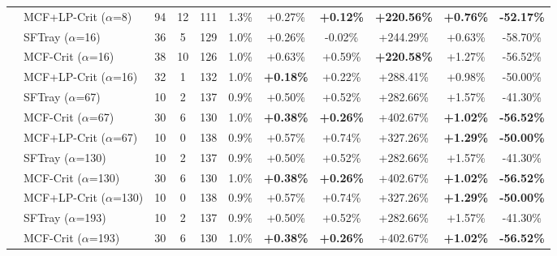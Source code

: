 \begin{table}[t]
{\begin{tabular}{ll|cccc|ccc|cc}
 & MCF+LP-Crit ($\alpha$=8) & 94 & 12 & 111 & 1.3\% & +0.27\% & \textbf{+0.12\%} & \textbf{+220.56\%} & \textbf{+0.76\%} & \textbf{-52.17\%} \\

\addlinespace[0.5em]

 & SFTray ($\alpha$=16) & 36 & 5 & 129 & 1.0\% & +0.26\% & -0.02\% & +244.29\% & +0.63\% & -58.70\% \\

 & MCF-Crit ($\alpha$=16) & 38 & 10 & 126 & 1.0\% & +0.63\% & +0.59\% & \textbf{+220.58\%} & +1.27\% & -56.52\% \\

 & MCF+LP-Crit ($\alpha$=16) & 32 & 1 & 132 & 1.0\% & \textbf{+0.18\%} & +0.22\% & +288.41\% & +0.98\% & -50.00\% \\

\addlinespace[0.5em]

 & SFTray ($\alpha$=67) & 10 & 2 & 137 & 0.9\% & +0.50\% & +0.52\% & +282.66\% & +1.57\% & -41.30\% \\

 & MCF-Crit ($\alpha$=67) & 30 & 6 & 130 & 1.0\% & \textbf{+0.38\%} & \textbf{+0.26\%} & +402.67\% & \textbf{+1.02\%} & \textbf{-56.52\%} \\

 & MCF+LP-Crit ($\alpha$=67) & 10 & 0 & 138 & 0.9\% & +0.57\% & +0.74\% & +327.26\% & \textbf{+1.29\%} & \textbf{-50.00\%} \\

\addlinespace[0.5em]

 & SFTray ($\alpha$=130) & 10 & 2 & 137 & 0.9\% & +0.50\% & +0.52\% & +282.66\% & +1.57\% & -41.30\% \\

 & MCF-Crit ($\alpha$=130) & 30 & 6 & 130 & 1.0\% & \textbf{+0.38\%} & \textbf{+0.26\%} & +402.67\% & \textbf{+1.02\%} & \textbf{-56.52\%} \\

 & MCF+LP-Crit ($\alpha$=130) & 10 & 0 & 138 & 0.9\% & +0.57\% & +0.74\% & +327.26\% & \textbf{+1.29\%} & \textbf{-50.00\%} \\

\addlinespace[0.5em]

 & SFTray ($\alpha$=193) & 10 & 2 & 137 & 0.9\% & +0.50\% & +0.52\% & +282.66\% & +1.57\% & -41.30\% \\

 & MCF-Crit ($\alpha$=193) & 30 & 6 & 130 & 1.0\% & \textbf{+0.38\%} & \textbf{+0.26\%} & +402.67\% & \textbf{+1.02\%} & \textbf{-56.52\%} \\


\end{tabular}}
\end{table}

